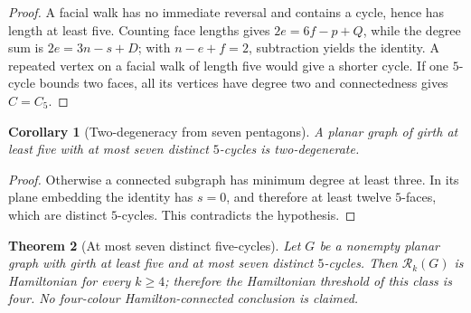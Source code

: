 \documentclass[11pt]{article}
\newtheorem{theorem}{Theorem}[section]
\newtheorem{corollary}[theorem]{Corollary}
\theoremstyle{remark}
\newcommand{\Rk}{\mathcal R_k}
\numberwithin{equation}{section}
\numberwithin{table}{section}
\begin{document}
\begin{proof}
A facial walk has no immediate reversal and contains a cycle, hence has
length at least five.  Counting face lengths gives
$2e=6f-p+Q$, while the degree sum is $2e=3n-s+D$; with $n-e+f=2$,
subtraction yields the identity.  A repeated vertex on a facial walk of
length five would give a shorter cycle.  If one $5$-cycle bounds two faces,
all its vertices have degree two and connectedness gives $C=C_5$.
\end{proof}

\begin{corollary}[Two-degeneracy from seven pentagons]
\label{cor:seven-pentagons-two-degenerate}
A planar graph of girth at least five with at most seven distinct $5$-cycles
is two-degenerate.
\end{corollary}

\begin{proof}
Otherwise a connected subgraph has minimum degree at least three.  In its
plane embedding the identity has $s=0$, and therefore at least twelve
$5$-faces, which are distinct $5$-cycles.  This contradicts the hypothesis.
\end{proof}

\begin{theorem}[At most seven distinct five-cycles]
\label{thm:seven-pentagons}
Let $G$ be a nonempty planar graph with girth at least five and at most
seven distinct $5$-cycles.  Then $\Rk(G)$ is Hamiltonian for every $k\ge4$;
therefore the Hamiltonian threshold of this class is four.  No
four-colour Hamilton-connected conclusion is claimed.
\end{theorem}
\end{document}

